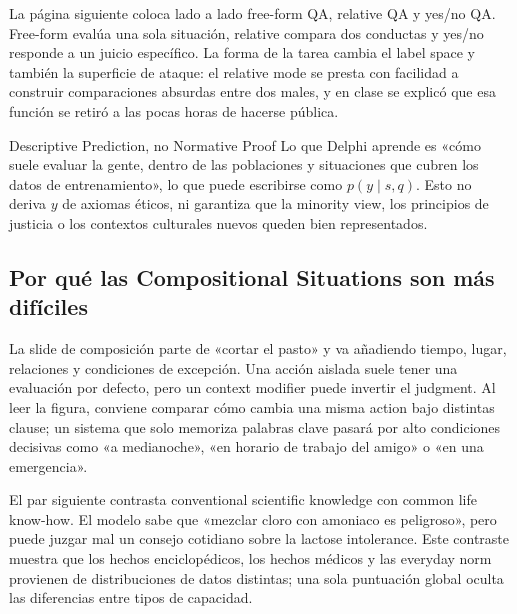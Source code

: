 
La página siguiente coloca lado a lado free-form QA, relative QA y yes/no QA. Free-form evalúa una sola situación, relative compara dos conductas y yes/no responde a un juicio específico. La forma de la tarea cambia el label space y también la superficie de ataque: el relative mode se presta con facilidad a construir comparaciones absurdas entre dos males, y en clase se explicó que esa función se retiró a las pocas horas de hacerse pública.


\begin{importantbox}{Descriptive Prediction, no Normative Proof}
Lo que Delphi aprende es «cómo suele evaluar la gente, dentro de las poblaciones y situaciones que cubren los datos de entrenamiento», lo que puede escribirse como $p(y\mid s,q)$. Esto no deriva $y$ de axiomas éticos, ni garantiza que la minority view, los principios de justicia o los contextos culturales nuevos queden bien representados.
\end{importantbox}

\subsection{Por qué las Compositional Situations son más difíciles}

La slide de composición parte de «cortar el pasto» y va añadiendo tiempo, lugar, relaciones y condiciones de excepción. Una acción aislada suele tener una evaluación por defecto, pero un context modifier puede invertir el judgment. Al leer la figura, conviene comparar cómo cambia una misma action bajo distintas clause; un sistema que solo memoriza palabras clave pasará por alto condiciones decisivas como «a medianoche», «en horario de trabajo del amigo» o «en una emergencia».


El par siguiente contrasta conventional scientific knowledge con common life know-how. El modelo sabe que «mezclar cloro con amoniaco es peligroso», pero puede juzgar mal un consejo cotidiano sobre la lactose intolerance. Este contraste muestra que los hechos enciclopédicos, los hechos médicos y las everyday norm provienen de distribuciones de datos distintas; una sola puntuación global oculta las diferencias entre tipos de capacidad.

